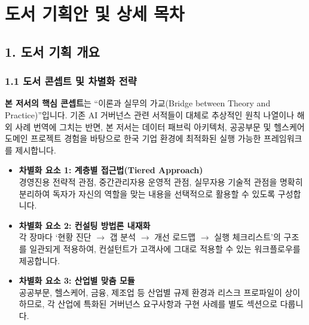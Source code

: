 \chapter*{도서 기획안 및 상세 목차}

\section*{1. 도서 기획 개요}

\subsection*{1.1 도서 콘셉트 및 차별화 전략}
\textbf{본 저서의 핵심 콘셉트}는 ``이론과 실무의 가교(Bridge between Theory and Practice)''입니다. 기존 AI 거버넌스 관련 서적들이 대체로 추상적인 원칙 나열이나 해외 사례 번역에 그치는 반면, 본 저서는 데이터 패브릭 아키텍처, 공공부문 및 헬스케어 도메인 프로젝트 경험을 바탕으로 한국 기업 환경에 최적화된 실행 가능한 프레임워크를 제시합니다.

\begin{itemize}
 \item \textbf{차별화 요소 1: 계층별 접근법(Tiered Approach)}\\
 경영진용 전략적 관점, 중간관리자용 운영적 관점, 실무자용 기술적 관점을 명확히 분리하여 독자가 자신의 역할을 맞는 내용을 선택적으로 활용할 수 있도록 구성합니다.
 \item \textbf{차별화 요소 2: 컨설팅 방법론 내재화}\\
 각 장마다 `현황 진단 $\rightarrow$ 갭 분석 $\rightarrow$ 개선 로드맵 $\rightarrow$ 실행 체크리스트'의 구조를 일관되게 적용하여, 컨설턴트가 고객사에 그대로 적용할 수 있는 워크플로우를 제공합니다.
 \item \textbf{차별화 요소 3: 산업별 맞춤 모듈}\\
 공공부문, 헬스케어, 금융, 제조업 등 산업별 규제 환경과 리스크 프로파일이 상이하므로, 각 산업에 특화된 거버넌스 요구사항과 구현 사례를 별도 섹션으로 다룹니다.
\end{itemize}

